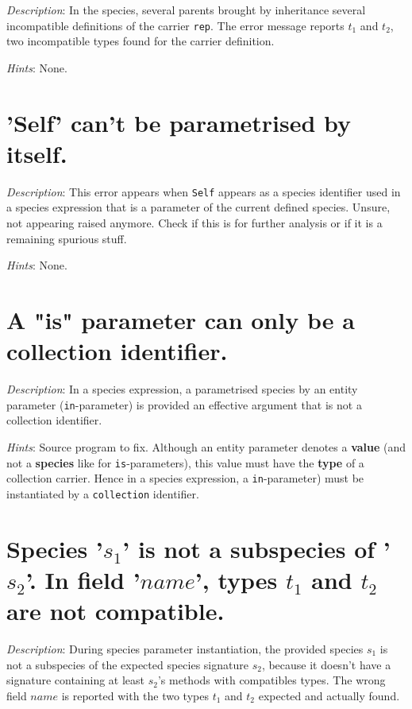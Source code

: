 {\em Description}: In the species, several parents brought by
inheritance several incompatible definitions of the carrier
{\tt rep}. The error message reports $t_1$ and $t_2$, two incompatible
types found for the carrier definition.

{\em Hints}: None.



\section*{'Self' can't be parametrised by itself.}

{\em Description}: This error appears when {\tt Self} appears as a
species identifier used in a species expression that is a parameter of
the current defined species.
{\color{red} Unsure, not appearing raised anymore. Check if this is
  for further analysis or if it is a remaining spurious stuff.}

{\em Hints}: None.



\section*{A "is" parameter can only be a collection identifier.}

{\em Description}: In a species expression, a parametrised species by
an entity parameter ({\tt in}-parameter) is provided an effective
argument that is not a collection identifier.

{\em Hints}: Source program to fix. Although an entity parameter
denotes a {\bf value} (and not a {\bf species} like for
{\tt is}-parameters), this value must have the {\bf type} of a
collection carrier. Hence in a species expression, a
{\tt in}-parameter) must be instantiated by a {\tt collection}
identifier.


\section*{Species '$s_1$' is not a subspecies of '$s_2$'. In field
  '$name$', types $t_1$ and $t_2$ are not compatible.}

{\em Description}: During species parameter instantiation, the
provided species $s_1$ is not a subspecies of the expected species
signature $s_2$, because it doesn't have a signature containing at
least $s_2$'s methods with compatibles types. The wrong field $name$
is reported with the two types $t_1$ and $t_2$ expected and actually
found.


